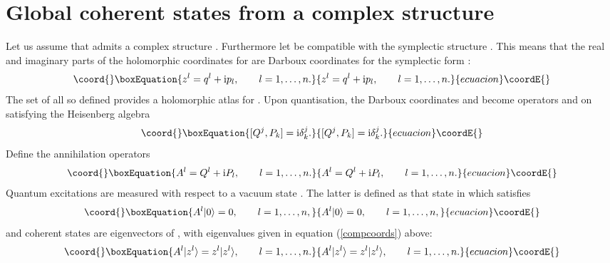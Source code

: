 \documentclass[a4paper,a4paper]{article}
\begin{document}
\section{Global coherent states from a complex structure}\label{globcoh}

Let us assume that \coordHE{} admits a complex structure \coordHE{}. 
Furthermore let \coordHE{} be compatible with the symplectic structure 
\coordHE{}. This means that the real and imaginary parts of the holomorphic 
coordinates \coordHE{} for \coordHE{} are Darboux coordinates for the symplectic form 
\coordHE{}:
\begin{equation}\coord{}\boxEquation{
z^l=q^l + {\rm i} p_l,  \qquad l=1,\ldots, n.
\label{compcoords}
}{
z^l=q^l + {\rm i} p_l,  \qquad l=1,\ldots, n.
}{ecuacion}\coordE{}\end{equation}
The set of all \coordHE{} so defined provides a holomorphic atlas for \coordHE{}.
Upon quantisation, the Darboux coordinates
\coordHE{} and \coordHE{} become operators \coordHE{} and \coordHE{} on \coordHE{} satisfying the Heisenberg algebra 
\begin{equation}\coord{}\boxEquation{
[Q^j, P_k]={\rm i}\delta^j_k.
\label{hei}
}{
[Q^j, P_k]={\rm i}\delta^j_k.
}{ecuacion}\coordE{}\end{equation}
Define the annihilation operators
\begin{equation}\coord{}\boxEquation{
A^l=Q^l+{\rm i} P_l,\qquad l=1,\ldots, n.
\label{anni}
}{
A^l=Q^l+{\rm i} P_l,\qquad l=1,\ldots, n.
}{ecuacion}\coordE{}\end{equation}
Quantum excitations are measured with respect to a vacuum state 
\myHighlight{$|0\rangle$}\coordHE{}. The latter is defined as that state in \coordHE{} which
satisfies
\begin{equation}\coord{}\boxEquation{
A^l|0\rangle = 0,  \qquad l=1, \ldots, n,
\label{vac}
}{
A^l|0\rangle = 0,  \qquad l=1, \ldots, n,
}{ecuacion}\coordE{}\end{equation}
and coherent states \coordHE{} are eigenvectors of \coordHE{}, 
with eigenvalues given in equation (\ref{compcoords}) above:
\begin{equation}\coord{}\boxEquation{
A^l|z^l\rangle=z^l|z^l\rangle,\qquad l=1,\ldots, n.
\label{annop}
}{
A^l|z^l\rangle=z^l|z^l\rangle,\qquad l=1,\ldots, n.
}{ecuacion}\coordE{}\end{equation}
\end{document}
